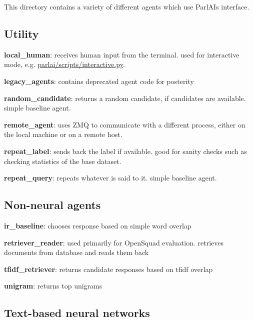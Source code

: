 This directory contains a variety of different agents which use Parl\+AI\textquotesingle{}s interface.

\subsection*{Utility}


\begin{DoxyItemize}
\item {\bfseries local\+\_\+human}\+: receives human input from the terminal. used for interactive mode, e.\+g. {\ttfamily \hyperlink{parlai_2scripts_2interactive_8py}{parlai/scripts/interactive.\+py}}.
\item {\bfseries legacy\+\_\+agents}\+: contains deprecated agent code for posterity
\item {\bfseries random\+\_\+candidate}\+: returns a random candidate, if candidates are available. simple baseline agent.
\item {\bfseries remote\+\_\+agent}\+: uses Z\+MQ to communicate with a different process, either on the local machine or on a remote host.
\item {\bfseries repeat\+\_\+label}\+: sends back the label if available. good for sanity checks such as checking statistics of the base dataset.
\item {\bfseries repeat\+\_\+query}\+: repeats whatever is said to it. simple baseline agent.
\end{DoxyItemize}

\subsection*{Non-\/neural agents}


\begin{DoxyItemize}
\item {\bfseries ir\+\_\+baseline}\+: chooses response based on simple word overlap
\item {\bfseries retriever\+\_\+reader}\+: used primarily for Open\+Squad evaluation. retrieves documents from database and reads them back
\item {\bfseries tfidf\+\_\+retriever}\+: returns candidate responses based on tfidf overlap
\item {\bfseries unigram}\+: returns top unigrams
\end{DoxyItemize}

\subsection*{Text-\/based neural networks}


